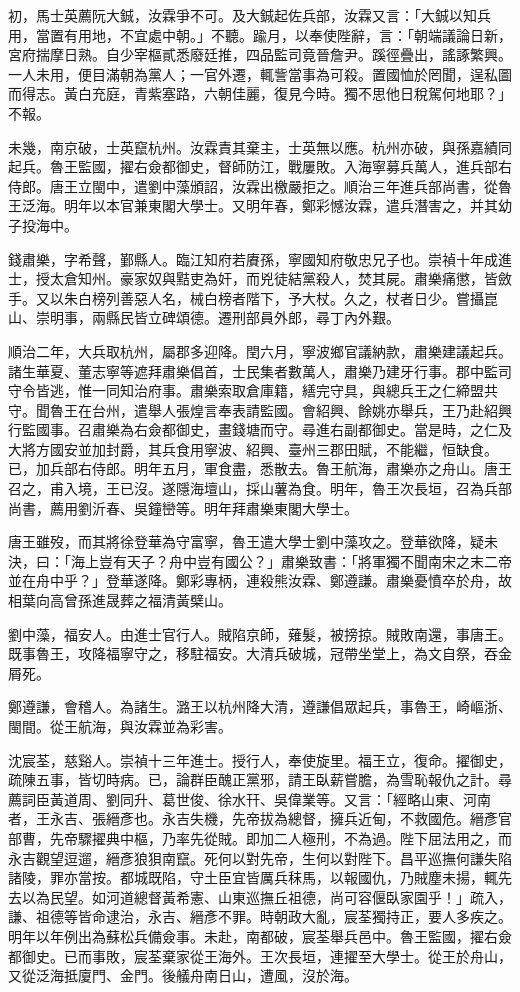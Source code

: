 \begin{pinyinscope}
初，馬士英薦阮大鋮，汝霖爭不可。及大鋮起佐兵部，汝霖又言：「大鋮以知兵用，當置有用地，不宜處中朝。」不聽。踰月，以奉使陛辭，言：「朝端議論日新，宮府揣摩日熟。自少宰樞貳悉廢廷推，四品監司竟晉詹尹。蹊徑疊出，謠諑繁興。一人未用，便目滿朝為黨人；一官外遷，輒訾當事為可殺。置國恤於罔聞，逞私圖而得志。黃白充庭，青紫塞路，六朝佳麗，復見今時。獨不思他日稅駕何地耶？」不報。

未幾，南京破，士英竄杭州。汝霖責其棄主，士英無以應。杭州亦破，與孫嘉績同起兵。魯王監國，擢右僉都御史，督師防江，戰屢敗。入海寧募兵萬人，進兵部右侍郎。唐王立閩中，遣劉中藻頒詔，汝霖出檄嚴拒之。順治三年進兵部尚書，從魯王泛海。明年以本官兼東閣大學士。又明年春，鄭彩憾汝霖，遣兵潛害之，并其幼子投海中。

錢肅樂，字希聲，鄞縣人。臨江知府若賡孫，寧國知府敬忠兄子也。崇禎十年成進士，授太倉知州。豪家奴與黠吏為奸，而兇徒結黨殺人，焚其屍。肅樂痛懲，皆斂手。又以朱白榜列善惡人名，械白榜者階下，予大杖。久之，杖者日少。嘗攝崑山、崇明事，兩縣民皆立碑頌德。遷刑部員外郎，尋丁內外艱。

順治二年，大兵取杭州，屬郡多迎降。閏六月，寧波鄉官議納款，肅樂建議起兵。諸生華夏、董志寧等遮拜肅樂倡首，士民集者數萬人，肅樂乃建牙行事。郡中監司守令皆逃，惟一同知治府事。肅樂索取倉庫籍，繕完守具，與總兵王之仁締盟共守。聞魯王在台州，遣舉人張煌言奉表請監國。會紹興、餘姚亦舉兵，王乃赴紹興行監國事。召肅樂為右僉都御史，畫錢塘而守。尋進右副都御史。當是時，之仁及大將方國安並加封爵，其兵食用寧波、紹興、臺州三郡田賦，不能繼，恒缺食。已，加兵部右侍郎。明年五月，軍食盡，悉散去。魯王航海，肅樂亦之舟山。唐王召之，甫入境，王已沒。遂隱海壇山，採山薯為食。明年，魯王次長垣，召為兵部尚書，薦用劉沂春、吳鐘巒等。明年拜肅樂東閣大學士。

唐王雖歿，而其將徐登華為守富寧，魯王遣大學士劉中藻攻之。登華欲降，疑未決，曰：「海上豈有天子？舟中豈有國公？」肅樂致書：「將軍獨不聞南宋之末二帝並在舟中乎？」登華遂降。鄭彩專柄，連殺熊汝霖、鄭遵謙。肅樂憂憤卒於舟，故相葉向高曾孫進晟葬之福清黃檗山。

劉中藻，福安人。由進士官行人。賊陷京師，薙髮，被搒掠。賊敗南還，事唐王。既事魯王，攻降福寧守之，移駐福安。大清兵破城，冠帶坐堂上，為文自祭，吞金屑死。

鄭遵謙，會稽人。為諸生。潞王以杭州降大清，遵謙倡眾起兵，事魯王，崎嶇浙、閩間。從王航海，與汝霖並為彩害。

沈宸荃，慈谿人。崇禎十三年進士。授行人，奉使旋里。福王立，復命。擢御史，疏陳五事，皆切時病。已，論群臣醜正黨邪，請王臥薪嘗膽，為雪恥報仇之計。尋薦詞臣黃道周、劉同升、葛世俊、徐水幵、吳偉業等。又言：「經略山東、河南者，王永吉、張縉彥也。永吉失機，先帝拔為總督，擁兵近甸，不救國危。縉彥官部曹，先帝驟擢典中樞，乃率先從賊。即加二人極刑，不為過。陛下屈法用之，而永吉觀望逗遛，縉彥狼狽南竄。死何以對先帝，生何以對陛下。昌平巡撫何謙失陷諸陵，罪亦當按。都城既陷，守土臣宜皆厲兵秣馬，以報國仇，乃賊塵未揚，輒先去以為民望。如河道總督黃希憲、山東巡撫丘祖德，尚可容偃臥家園乎！」疏入，謙、祖德等皆命逮治，永吉、縉彥不罪。時朝政大亂，宸荃獨持正，要人多疾之。明年以年例出為蘇松兵備僉事。未赴，南都破，宸荃舉兵邑中。魯王監國，擢右僉都御史。已而事敗，宸荃棄家從王海外。王次長垣，連擢至大學士。從王於舟山，又從泛海抵廈門、金門。後艤舟南日山，遭風，沒於海。


\end{pinyinscope}
